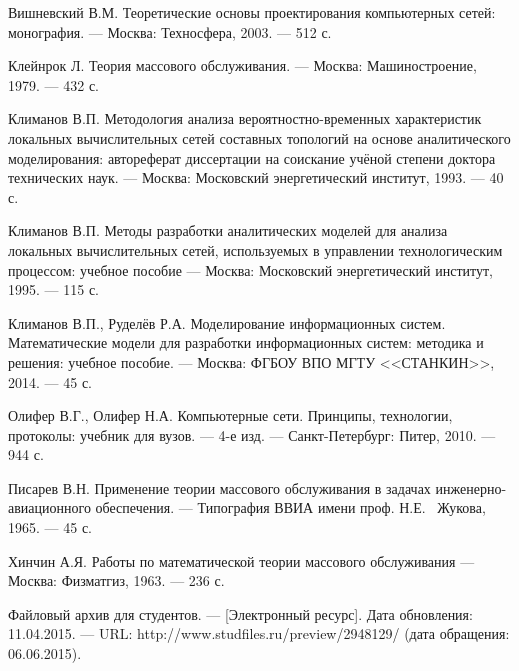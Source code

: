 \documentclass[oneside, draft, 14pt, a4paper]{extreport}
\begin{document}
\renewcommand{\bibname}{\centering Список литературы}
\begin{thebibliography}{00}

 Вишневский В.М.
Теоретические основы проектирования компьютерных сетей: монография.
--- Москва: Техносфера, 2003.
--- 512 с.

 Клейнрок Л.
Теория массового обслуживания.
--- Москва: Машиностроение, 1979.
--- 432 с.

 Климанов В.П.
Методология анализа вероятностно-временных характеристик локальных вычислительных сетей составных топологий на основе аналитического
моделирования: автореферат диссертации на соискание учёной степени доктора технических наук.
--- Москва: Московский энергетический институт, 1993.
--- 40 с.

 Климанов В.П.
Методы разработки аналитических моделей для анализа локальных вычислительных сетей, используемых в управлении технологическим процессом: учебное пособие
--- Москва: Московский энергетический институт, 1995.
--- 115 с.

 Климанов В.П., Руделёв Р.А.
Моделирование информационных систем. Математические модели для разработки информационных систем: методика и решения: учебное пособие.
--- Москва: ФГБОУ ВПО МГТУ <<СТАНКИН>>, 2014.
--- 45 с.

 Олифер В.Г., Олифер Н.А.
Компьютерные сети. Принципы, технологии, протоколы: учебник для вузов.
--- 4-е изд.
--- Санкт-Петербург: Питер, 2010.
--- 944 с.

 Писарев В.Н.
Применение теории массового обслуживания в задачах инженерно-авиационного обеспечения.
--- Типография ВВИА имени проф. Н.Е. ~Жукова, 1965.
--- 45 с.

 Хинчин А.Я.
Работы по математической теории массового обслуживания
--- Москва: Физматгиз, 1963.
--- 236 с.

Файловый архив для студентов.
--- [Электронный ресурс]. Дата обновления: 11.04.2015.
--- URL: http://www.studfiles.ru/preview/2948129/ (дата обращения: 06.06.2015).

\end{thebibliography}
\end{document}
